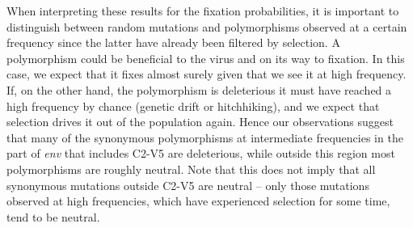 \documentclass[rmp, twocolumn]{revtex4}
\newcommand{\env}{\textit{env}}
\newcommand{\shankaregion}{C2-V5}
\begin{document}
When interpreting these results for the fixation probabilities, it is important
to distinguish between random mutations and polymorphisms observed at a certain
frequency since the latter have already been filtered by selection.
A polymorphism could be beneficial to the virus and on its way to fixation. In
this case, we expect that it fixes almost surely given that we see it at high
frequency. If, on the other hand, the polymorphism is deleterious it must have
reached a high frequency by chance (genetic drift or hitchhiking), and
we expect that selection drives it out of the population again. Hence our
observations suggest that many of the synonymous polymorphisms at intermediate
frequencies in the part of \env{} that includes \shankaregion{} are
deleterious, while outside this region most polymorphisms are roughly
neutral. Note that this does not imply that all synonymous mutations outside 
\shankaregion{} are neutral -- only those mutations observed at high frequencies, which
have experienced selection for some time, tend to be neutral.
\end{document}
